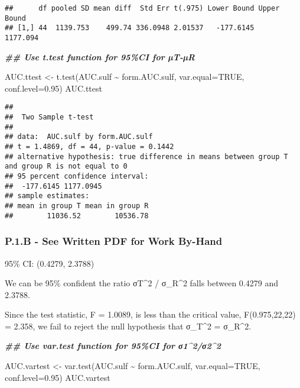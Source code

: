 \documentclass[
]{article}
\newenvironment{Shaded}{\begin{snugshade}}{\end{snugshade}}
\newcommand{\AttributeTok}[1]{\textcolor[rgb]{0.77,0.63,0.00}{#1}}
\newcommand{\ConstantTok}[1]{\textcolor[rgb]{0.00,0.00,0.00}{#1}}
\newcommand{\DocumentationTok}[1]{\textcolor[rgb]{0.56,0.35,0.01}{\textbf{\textit{#1}}}}
\newcommand{\FloatTok}[1]{\textcolor[rgb]{0.00,0.00,0.81}{#1}}
\newcommand{\FunctionTok}[1]{\textcolor[rgb]{0.00,0.00,0.00}{#1}}
\newcommand{\NormalTok}[1]{#1}
\newcommand{\OtherTok}[1]{\textcolor[rgb]{0.56,0.35,0.01}{#1}}
\newcommand{\SpecialCharTok}[1]{\textcolor[rgb]{0.00,0.00,0.00}{#1}}
\begin{document}
\begin{verbatim}
##      df pooled SD mean diff  Std Err t(.975) Lower Bound Upper Bound
## [1,] 44  1139.753    499.74 336.0948 2.01537   -177.6145    1177.094
\end{verbatim}

\begin{Shaded}
\begin{Highlighting}[]
\DocumentationTok{\#\# Use t.test function for 95\%CI for µT{-}µR}

\NormalTok{AUC.ttest }\OtherTok{\textless{}{-}} \FunctionTok{t.test}\NormalTok{(AUC.sulf }\SpecialCharTok{\textasciitilde{}}\NormalTok{ form.AUC.sulf, }\AttributeTok{var.equal=}\ConstantTok{TRUE}\NormalTok{, }\AttributeTok{conf.level=}\FloatTok{0.95}\NormalTok{)}
\NormalTok{AUC.ttest}
\end{Highlighting}
\end{Shaded}

\begin{verbatim}
## 
##  Two Sample t-test
## 
## data:  AUC.sulf by form.AUC.sulf
## t = 1.4869, df = 44, p-value = 0.1442
## alternative hypothesis: true difference in means between group T and group R is not equal to 0
## 95 percent confidence interval:
##  -177.6145 1177.0945
## sample estimates:
## mean in group T mean in group R 
##        11036.52        10536.78
\end{verbatim}

\hypertarget{p.1.b---see-written-pdf-for-work-by-hand}{%
\subsubsection{P.1.B - See Written PDF for Work
By-Hand}\label{p.1.b---see-written-pdf-for-work-by-hand}}

95\% CI: (0.4279, 2.3788)

We can be 95\% confident the ratio σT\^{}2 / σ\_R\^{}2 falls between
0.4279 and 2.3788.

Since the test statistic, F = 1.0089, is less than the critical value,
F(0.975,22,22) = 2.358, we fail to reject the null hypothesis that
σ\_T\^{}2 = σ\_R\^{}2.

\begin{Shaded}
\begin{Highlighting}[]
\DocumentationTok{\#\# Use var.test function for 95\%CI for σ1\^{}2/σ2\^{}2}

\NormalTok{AUC.vartest }\OtherTok{\textless{}{-}} \FunctionTok{var.test}\NormalTok{(AUC.sulf }\SpecialCharTok{\textasciitilde{}}\NormalTok{ form.AUC.sulf, }\AttributeTok{var.equal=}\ConstantTok{TRUE}\NormalTok{, }\AttributeTok{conf.level=}\FloatTok{0.95}\NormalTok{)}
\NormalTok{AUC.vartest}
\end{Highlighting}
\end{Shaded}
\end{document}
